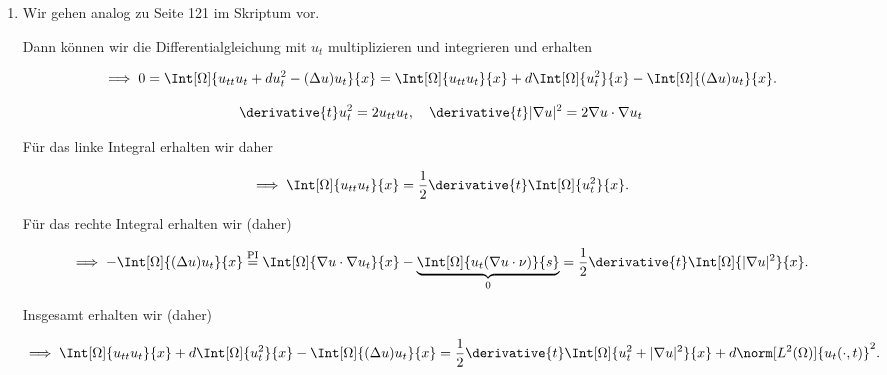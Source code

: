 \begin{solution}

\phantom{}

\begin{enumerate}[label = (\roman*)]

    \item Wir gehen analog zu Seite 121 im Skriptum vor.

    Dann können wir die Differentialgleichung mit $u_t$ multiplizieren und integrieren und erhalten

    \begin{align*}
        \implies
        0
        =
        \Int[\Omega]{u_{tt} u_t + d u_t^2 - (\Delta u) u_t}{x}
        =
        \Int[\Omega]{u_{tt} u_t}{x}
        +
        d \Int[\Omega]{u_t^2}{x}
        -
        \Int[\Omega]{(\Delta u) u_t}{x}.
    \end{align*}

    \begin{align*}
        \derivative{t} u_t^2 = 2 u_{tt} u_t,
        \quad
        \derivative{t} |\nabla u|^2 = 2 \nabla u \cdot \nabla u_t
    \end{align*}

    Für das linke Integral erhalten wir daher

    \begin{align*}
        \implies
        \Int[\Omega]{u_{tt} u_t}{x}
        =
        \frac{1}{2}
        \derivative{t}
        \Int[\Omega]{u_t^2}{x}.
    \end{align*}

    Für das rechte Integral erhalten wir (daher)

    \begin{align*}
        \implies
        -\Int[\Omega]{(\Delta u) u_t}{x}
        \stackrel
        {
            \mathrm{PI}
        }{=}
        \Int[\Omega]{\nabla u \cdot \nabla u_t}{x}
        -
        \underbrace
        {
            \Int[\Omega]{u_t (\nabla u \cdot \nu)}{s}
        }_0
        =
        \frac{1}{2}
        \derivative{t}
        \Int[\Omega]{|\nabla u|^2}{x}.
    \end{align*}

    Insgesamt erhalten wir (daher)

    \begin{align*}
        \implies
        \Int[\Omega]{u_{tt} u_t}{x}
        +
        d \Int[\Omega]{u_t^2}{x}
        -
        \Int[\Omega]{(\Delta u) u_t}{x}
        =
        \frac{1}{2}
        \derivative{t}
        \Int[\Omega]{u_t^2 + |\nabla u|^2}{x}
        +
        d \norm[L^2(\Omega)]{u_t(\cdot, t)}^2.
    \end{align*}


\end{enumerate}
\end{solution}
